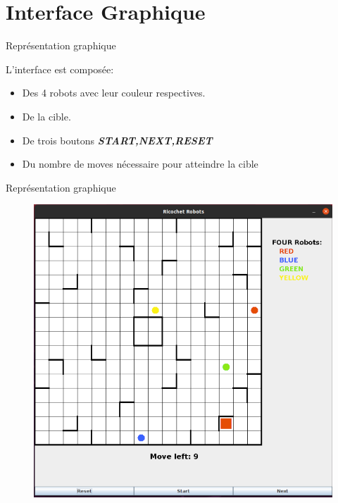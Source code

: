 \documentclass{beamer}
\begin{document}
\section{Interface Graphique}
    \begin{frame}{Représentation graphique}
        \begin{block}{L'interface est composée:}
            \begin{itemize}
                \item Des 4 robots avec leur couleur respectives.
                \item De la cible.
                \item De trois boutons \textbf{\textit{START,NEXT,RESET }}
                \item Du nombre de moves nécessaire pour atteindre la cible
            \end{itemize}
        \end{block}
    \end{frame}
    \begin{frame}{Représentation graphique}
        \begin{figure}
            \centering
            \includegraphics[scale=0.3]{Images/board.png}
        \end{figure}
    \end{frame}
\end{document}
